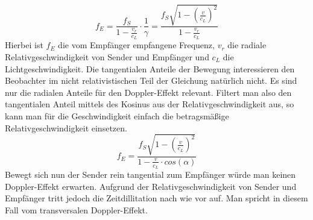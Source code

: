 \begin{equation}
\label{freq_e1}
f_E=\frac{f_S}{1-\frac{v_r}{c_L}}\cdot \frac{1}{\gamma}=\frac{f_S\sqrt{1-\left(\frac{v}{c_L}\right)^2}}{1-\frac{v_r}{c_L}}
\end{equation} 
Hierbei ist \begin{math}{f_E}\end{math} die vom Empfänger empfangene Frequenz, \begin{math}{v_r}\end{math} die radiale Relativgeschwindigkeit von Sender und Empfänger und \begin{math}{c_L}\end{math} die Lichtgeschwindigkeit. Die tangentialen Anteile der Bewegung interessieren den Beobachter im nicht relativistischen Teil der Gleichung natürlich nicht. Es sind nur die radialen Anteile für den Doppler-Effekt relevant. Filtert man also den tangentialen Anteil mittels des Kosinus aus der Relativgeschwindigkeit aus, so kann man für die Geschwindigkeit einfach die betragsmäßige Relativgeschwindigkeit einsetzen.   
\begin{equation}
\label{freq_e2}
f_E=\frac{f_S\sqrt{1-\left(\frac{v}{c_L}\right)^2}}{1-\frac{v}{c_L} \cdot cos(\alpha)}
\end{equation}
Bewegt sich nun der Sender rein tangential zum Empfänger würde man keinen Doppler-Effekt erwarten. Aufgrund der Relativgeschwindigkeit von Sender und Empfänger tritt jedoch die Zeitdillitation nach wie vor auf. Man spricht in diesem Fall vom transversalen Doppler-Effekt.    
